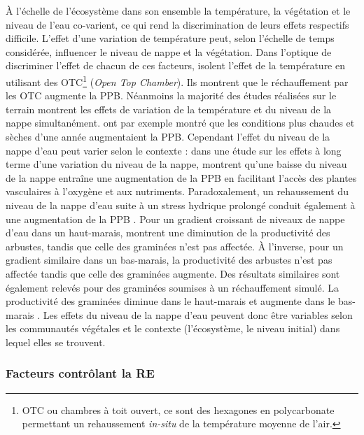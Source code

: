 À l'échelle de l'écosystème dans son ensemble la température, la végétation et le niveau de l'eau co-varient, ce qui rend la discrimination de leurs effets respectifs difficile.
L'effet d'une variation de température peut, selon l'échelle de temps considérée, influencer le niveau de nappe et la végétation.
Dans l'optique de discriminer l'effet de chacun de ces facteurs, \citet{munir2015} isolent l'effet de la température en utilisant des OTC\footnote{OTC ou chambres à toit ouvert, ce sont des hexagones en polycarbonate permettant un rehaussement \textit{in-situ} de la température moyenne de l'air.} (\textit{Open Top Chamber}).
Ils montrent que le réchauffement par les OTC augmente la PPB.
Néanmoins la majorité des études réalisées sur le terrain montrent les effets de variation de la température et du niveau de la nappe simultanément.
\citet{cai2010} ont par exemple montré que les conditions plus chaudes et sèches d'une année augmentaient la PPB.
Cependant l'effet du niveau de la nappe d'eau peut varier selon le contexte : dans une étude sur les effets à long terme d'une variation du niveau de la nappe, \citet{ballantyne2014} montrent qu'une baisse du niveau de la nappe entraîne une augmentation de la PPB en facilitant l'accès des plantes vasculaires à l'oxygène et aux nutriments.
Paradoxalement, un rehaussement du niveau de la nappe d'eau suite à un stress hydrique prolongé conduit également à une augmentation de la PPB \citep{strack2013}.
Pour un gradient croissant de niveaux de nappe d'eau dans un haut-marais, \citet{weltzin2000} montrent une diminution de la productivité des arbustes, tandis que celle des graminées n'est pas affectée.
À l'inverse, pour un gradient similaire dans un bas-marais, la productivité des arbustes n'est pas affectée tandis que celle des graminées augmente.
Des résultats similaires sont également relevés pour des graminées soumises à un réchauffement simulé.
La productivité des graminées diminue dans le haut-marais et augmente dans le bas-marais \citep{weltzin2000}.
Les effets du niveau de la nappe d'eau peuvent donc être variables selon les communautés végétales et le contexte (l'écosystème, le niveau initial) dans lequel elles se trouvent.

\subsubsection{Facteurs contrôlant la RE}

